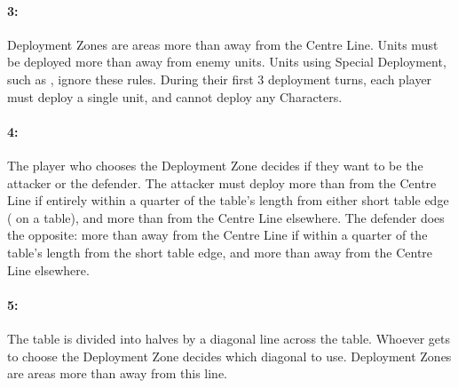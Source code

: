 \begin{minipage}{0.65\textwidth}
\hypertarget{counterthrust}{\paragraph{3\spacebeforecolon{}: \counterthrust}}
\vspace*{0.5ex}

Deployment Zones are areas more than  away from the Centre Line. Units must be deployed more than  away from enemy units. Units using Special Deployment, such as \hyperref[scout]{\scout}, ignore these rules. During their first 3 deployment turns, each player must deploy a single unit, and cannot deploy any Characters.
\end{minipage}\hfill\begin{minipage}{0.32\textwidth}
\def\svgwidth{\textwidth}

\end{minipage}

\begin{minipage}{0.65\textwidth}
\hypertarget{encircle}{\paragraph{4\spacebeforecolon{}: \encircle}}
\vspace*{0.5ex}

The player who chooses the Deployment Zone decides if they want to be the attacker or the defender. The attacker must deploy more than  from the Centre Line if entirely within a quarter of the table's length from either short table edge ( on a  table), and more than  from the Centre Line elsewhere. The defender does the opposite: more than  away from the Centre Line if within a quarter of the table's length from the short table edge, and more than  away from the Centre Line elsewhere.
\end{minipage}\hfill\begin{minipage}{0.32\textwidth}
\def\svgwidth{\textwidth}
\def\deploymentfigAttacker{Attacker}
\def\deploymentfigDefender{Defender}

\end{minipage}

\begin{minipage}{0.65\textwidth}
\hypertarget{refused_flank}{\paragraph{5\spacebeforecolon{}: }}
\vspace*{0.5ex}

The table is divided into halves by a diagonal line across the table. Whoever gets to choose the Deployment Zone decides which diagonal to use. Deployment Zones are areas more than  away from this line.
\end{minipage}\hfill\begin{minipage}{0.32\textwidth}
\def\svgwidth{\textwidth}

\end{minipage}

